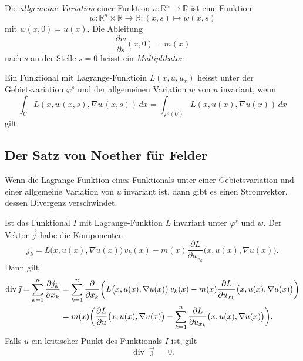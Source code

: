 \begin{definition}
Die {\em allgemeine Variation} einer Funktion
%
\(
u
\colon
\mathbb{R}^n\to \mathbb{R}
\)
ist eine Funktion
\[
w
\colon
\mathbb{R}^n \times\mathbb{R}
\to
\mathbb{R}
:
(x,s)
\mapsto
w(x,s)
\]
mit $w(x,0)=u(x)$.
Die Ableitung
\[
\frac{\partial w}{\partial s}(x,0) = m(x)
\]
nach $s$ an der Stelle $s=0$ heisst ein {\em Multiplikator}.
%
\end{definition}

\begin{definition}
Ein Funktional mit Lagrange-Funktioin
$L(x,u,u_x)$ heisst unter der Gebietsvariation $\varphi^s$ und
der allgemeinen Variation $w$ von $u$ invariant, wenn
\begin{equation}
\int_U
L(x,w(x,s),\nabla w(x,s))\,dx
=
\int_{\varphi^s(U)}
L(x,u(x),\nabla u(x))\,dx
\label{buch:symmetrien:felder:eqn:invarianz}
\end{equation}
gilt.
\end{definition}

%
%
\subsection{Der Satz von Noether für Felder}
Wenn die Lagrange-Funktion eines Funktionals unter einer Gebietsvariation
und einer allgemeine Variation von $u$ invariant ist, dann gibt es einen
Stromvektor, dessen Divergenz verschwindet.

\begin{satz}
Ist das Funktional $I$ mit Lagrange-Funktion $L$ invariant unter $\varphi^s$
und $w$.
Der Vektor $\vec{j}$ habe die Komponenten
%
\[
j_k
=
L\bigl(x,u(x),\nabla u(x)\bigr)\,v_k(x)
-
m(x)
\frac{\partial L}{\partial u_{x_k}}\bigl(x,u(x),\nabla u(x)\bigr).
\]
Dann gilt
\begin{align}
\operatorname{div}\vec{\jmath}
=
\sum_{k=1}^n \frac{\partial j_k}{\partial x_k}
&=
\sum_{k=1}^n
\frac{\partial }{\partial x_k}
\biggl(
L\bigl(x,u(x),\nabla u(x)\bigr)\,v_k(x)
-
m(x)
\frac{\partial L}{\partial u_{x_k}}
\bigl(x,u(x),\nabla u(x)\bigr)
\biggr)
\notag
\\
&=
m(x)\biggl(
\frac{\partial L}{\partial u}\bigl(x,u(x),\nabla u(x)\bigr)
-
\sum_{k=1}^n\frac{\partial L}{\partial u_{x_k}}\bigl(x,u(x),\nabla u(x)\bigr)
\biggr).
\label{buch:symmetrien:felder:eqn:rhs}
\end{align}
Falls $u$ ein kritischer Punkt des Funktionals $I$ ist, gilt
\[
\operatorname{div}\vec{\jmath}=0.
\]
\end{satz}

